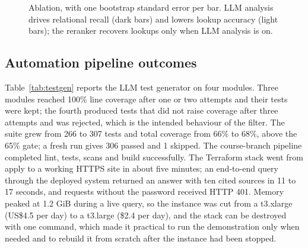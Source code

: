 \documentclass[12pt,onecolumn,draftclsnofoot]{IEEEtran}
\begin{document}
\begin{figure}[t]
\centering
{}
\caption{Ablation, with one bootstrap standard error per bar. LLM analysis drives relational recall (dark bars) and lowers lookup accuracy (light bars); the reranker recovers lookups only when LLM analysis is on.}
\label{fig:ablation}
\end{figure}

\subsection{Automation pipeline outcomes}
Table~\ref{tab:testgen} reports the LLM test generator on four modules. Three modules reached 100\% line coverage after one or two attempts and their tests were kept; the fourth produced tests that did not raise coverage after three attempts and was rejected, which is the intended behaviour of the filter. The suite grew from 266 to 307 tests and total coverage from 66\% to 68\%, above the 65\% gate; a fresh run gives 306 passed and 1 skipped. The course-branch pipeline completed lint, tests, scans and build successfully. The Terraform stack went from apply to a working HTTPS site in about five minutes; an end-to-end query through the deployed system returned an answer with ten cited sources in 11 to 17 seconds, and requests without the password received HTTP 401. Memory peaked at 1.2 GiB during a live query, so the instance was cut from a t3.xlarge (US\$4.5 per day) to a t3.large (\$2.4 per day), and the stack can be destroyed with one command, which made it practical to run the demonstration only when needed and to rebuild it from scratch after the instance had been stopped.
\end{document}
